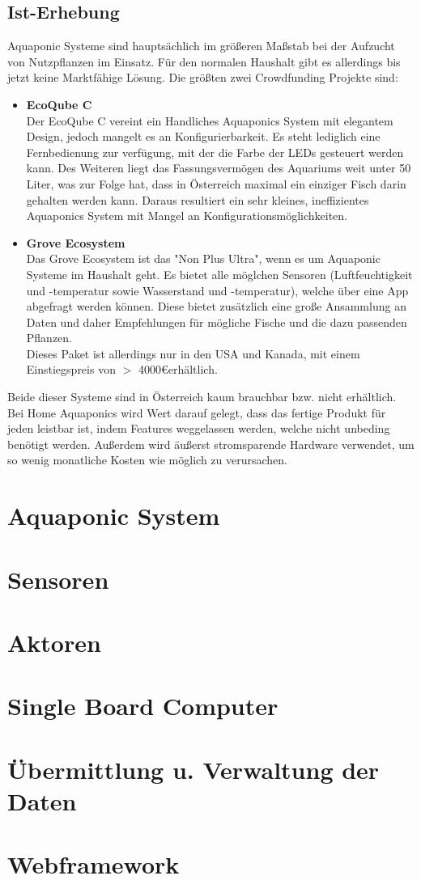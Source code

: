 \documentclass[11pt]{article}
\begin{document}
\subsection{Ist-Erhebung}
Aquaponic Systeme sind haupts\"achlich im gr\"o{\ss}eren Ma{\ss}stab bei der Aufzucht von Nutzpflanzen im Einsatz. F\"ur den normalen Haushalt gibt es allerdings bis jetzt keine Marktf\"ahige L\"osung. Die gr\"o{\ss}ten zwei Crowdfunding Projekte sind:
\begin{itemize}
	\item \textbf{EcoQube C}\\
		Der EcoQube C vereint ein Handliches Aquaponics System mit elegantem Design, jedoch mangelt es an Konfigurierbarkeit. Es steht lediglich eine Fernbedienung zur verfügung, mit der die Farbe der LEDs gesteuert werden kann. Des Weiteren liegt das Fassungsvermögen des Aquariums weit unter 50 Liter, was zur Folge hat, dass in \"Osterreich maximal ein einziger Fisch darin gehalten werden kann. Daraus resultiert ein sehr kleines, ineffizientes Aquaponics System mit Mangel an Konfigurationsm\"oglichkeiten. \\
	\item \textbf{Grove Ecosystem}\\
	Das Grove Ecosystem ist das "Non Plus Ultra", wenn es um Aquaponic Systeme im Haushalt geht. Es bietet alle m\"oglchen Sensoren (Luftfeuchtigkeit und -temperatur sowie Wasserstand und -temperatur), welche \"uber eine App abgefragt werden k\"onnen. Diese bietet zus\"atzlich eine gro{\ss}e Ansammlung an Daten und daher Empfehlungen f\"ur m\"ogliche Fische und die dazu passenden Pflanzen. \\
	Dieses Paket ist allerdings nur in den USA und Kanada, mit einem Einstiegspreis von $>$ 4000\euro\hspace{0.5em}erh\"altlich.
\end{itemize}
Beide dieser Systeme sind in \"Osterreich kaum brauchbar bzw. nicht erh\"altlich. Bei Home Aquaponics wird Wert darauf gelegt, dass das fertige Produkt f\"ur jeden leistbar ist, indem Features weggelassen werden, welche nicht unbeding ben\"otigt werden. Au{\ss}erdem wird \"au{\ss}erst stromsparende Hardware verwendet, um so wenig monatliche Kosten wie m\"oglich zu verursachen.

\section{Aquaponic System}

\section{Sensoren}

\section{Aktoren}

\section{Single Board Computer}

\section{\"Ubermittlung u. Verwaltung der Daten}

\section{Webframework}
\end{document}
